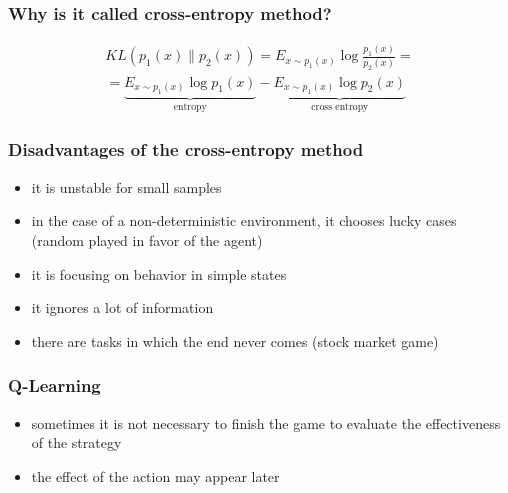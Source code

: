 \documentclass[fullscreen=true, bookmarks=true, hyperref={pdfencoding=unicode}]{beamer}
\begin{document}
\begin{frame}
  \frametitle{Why is it called cross-entropy method?}

   \begin{align*}
     KL(p_1(x) \| p_2(x)) = E_{x \sim p_1(x)} \log \frac{p_1(x)}{p_2(x)} = \\
     =
     \underbrace{E_{x \sim p_1(x)} \log {p_1(x)}}_{
       \text{entropy}
     }-
     \underbrace{E_{x \sim p_1(x)} \log {p_2(x)}}_{
     \text{cross entropy}
     }
   \end{align*}
\end{frame}


\begin{frame}
  \frametitle{Disadvantages of the cross-entropy method}

    \begin{itemize}
      \pause
      \item it is unstable for small samples
      \pause
      \item in the case of a non-deterministic environment, it chooses lucky cases (random played in favor of the agent)
      \pause
      \item it is focusing on behavior in simple states
      \pause
      \item it ignores a lot of information
      \pause
      \item there are tasks in which the end never comes (stock market game)
   \end{itemize}
\end{frame}


\begin{frame}
  \frametitle{Q-Learning}

  \begin{itemize}
    \item sometimes it is not necessary to finish the game to evaluate the effectiveness of the strategy
    \item the effect of the action may appear later
   \end{itemize}
\end{frame}
\end{document}
